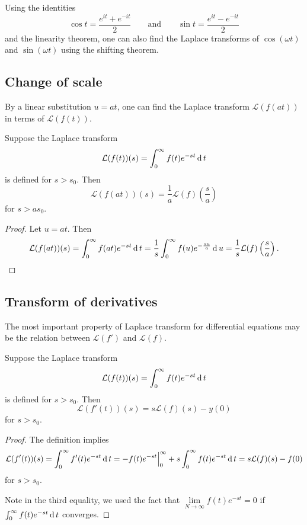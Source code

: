 \begin{remark}
Using the identities
\[\cos t=\frac{e^{it}+e^{-it}}{2}\qquad\text{and}\qquad \sin t=\frac{e^{it}-e^{-it}}{2}\]
and the linearity theorem, one can also find the Laplace transforms of $\cos(\omega t)$ and $\sin(\omega t)$ using the shifting theorem.  
\end{remark}

\subsection*{Change of scale}

By a linear substitution $u=at$, one can find the Laplace transform $\mathcal{L}(f(at))$ in terms of $\mathcal{L}(f(t))$.

\begin{theorem}
  Suppose the Laplace transform 
    \[\mathcal{L}(f(t))(s)=\int_0^\infty f(t)e^{-st}\operatorname{d} t\]
    is defined for $s>s_0$. Then
   \[\mathcal{L}(f(at))(s)=\frac1a\mathcal{L}(f)\left(\frac{s}{a}\right)\]
    for $s >as_0$.
\end{theorem}
\begin{proof}
  Let $u=at$. Then
  \[
    \mathcal{L}(f(at))(s)=\int_0^\infty f(at)e^{-st}\operatorname{d} t=\frac1s\int_0^\infty f(u)e^{-\frac{su}{a}}\operatorname{d} u=\frac1s\mathcal{L}(f)\left(\frac sa\right).
  \]
\end{proof}

\subsection*{Transform of derivatives}

The most important property of Laplace transform for differential equations may be the relation between $\mathcal{L}(f')$ and $\mathcal{L}(f)$.

\begin{theorem}
  Suppose the Laplace transform 
    \[\mathcal{L}(f(t))(s)=\int_0^\infty f(t)e^{-st} \operatorname{d} t\]
    is defined for $s>s_0$. Then
   \[\mathcal{L}(f'(t))(s)=s\mathcal{L}(f)(s)-y(0)\]
    for $s >s_0$.
\end{theorem}
\begin{proof}
  The definition implies
  \[\mathcal{L}(f'(t))(s)=\int_0^\infty f'(t)e^{-st} \operatorname{d} t=-f(t)e^{-st}\Big|_0^\infty+s\int_0^\infty f(t)e^{-st}\operatorname{d} t=s\mathcal{L}(f)(s)-f(0)\]
  for $s>s_0$.

  Note in the third equality, we used the fact that $\lim\limits_{N\to \infty} f(t)e^{-st}=0$ if $\int_0^\infty f(t)e^{-st}\operatorname{d} t$ converges.
\end{proof}

